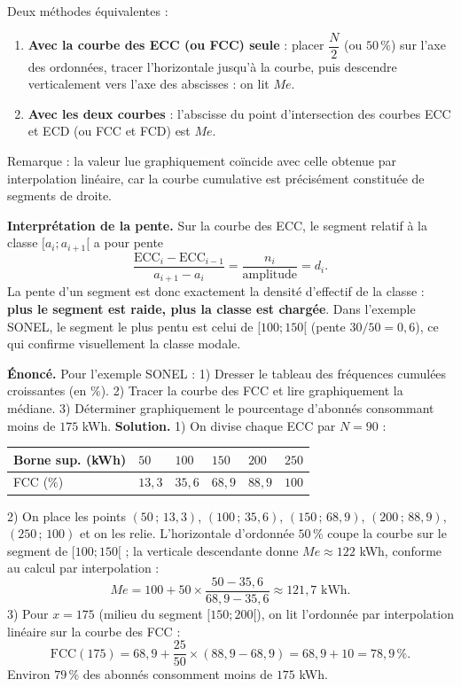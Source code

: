 \documentclass[11pt]{article}
\newcommand{\cle}[1]{{\popxbold\color{popdark}#1}}
\begin{document}
\begin{methode}
Deux méthodes équivalentes :
\begin{enumerate}
\item \textbf{Avec la courbe des ECC (ou FCC) seule} : placer $\dfrac{N}{2}$ (ou $50\,\%$) sur l'axe des ordonnées, tracer l'horizontale jusqu'à la courbe, puis descendre verticalement vers l'axe des abscisses : on lit $Me$.
\item \textbf{Avec les deux courbes} : l'abscisse du point d'intersection des courbes ECC et ECD (ou FCC et FCD) est $Me$.
\end{enumerate}
Remarque : la valeur lue graphiquement coïncide avec celle obtenue par interpolation linéaire, car la courbe cumulative est précisément constituée de segments de droite.
\end{methode}

\textbf{Interprétation de la pente.} Sur la courbe des ECC, le segment relatif à la classe $[a_i ; a_{i+1}[$ a pour pente
\[ \frac{\text{ECC}_i - \text{ECC}_{i-1}}{a_{i+1}-a_i} = \frac{n_i}{\text{amplitude}} = d_i. \]
La pente d'un segment est donc exactement la \cle{densité d'effectif} de la classe : \textbf{plus le segment est raide, plus la classe est chargée}. Dans l'exemple SONEL, le segment le plus pentu est celui de $[100;150[$ (pente $30/50 = 0{,}6$), ce qui confirme visuellement la classe modale.

\begin{exoresolu}
\textbf{Énoncé.} Pour l'exemple SONEL : 1) Dresser le tableau des fréquences cumulées croissantes (en $\%$). 2) Tracer la courbe des FCC et lire graphiquement la médiane. 3) Déterminer graphiquement le pourcentage d'abonnés consommant moins de $175$ kWh.
\tcblower
\textbf{Solution.} 1) On divise chaque ECC par $N = 90$ :
\begin{center}
\begin{tabularx}{\linewidth}{|l|X|X|X|X|X|}\hline
\rowcolor{popblueL} Borne sup. (kWh) & $50$ & $100$ & $150$ & $200$ & $250$ \\ \hline
FCC ($\%$) & $13{,}3$ & $35{,}6$ & $68{,}9$ & $88{,}9$ & $100$ \\ \hline
\end{tabularx}
\end{center}
2) On place les points $(50\,;\,13{,}3)$, $(100\,;\,35{,}6)$, $(150\,;\,68{,}9)$, $(200\,;\,88{,}9)$, $(250\,;\,100)$ et on les relie. L'horizontale d'ordonnée $50\,\%$ coupe la courbe sur le segment de $[100;150[$ ; la verticale descendante donne $Me \approx 122$ kWh, conforme au calcul par interpolation :
\[ Me = 100 + 50\times\frac{50-35{,}6}{68{,}9-35{,}6} \approx 121{,}7 \text{ kWh}. \]
3) Pour $x = 175$ (milieu du segment $[150;200[$), on lit l'ordonnée par interpolation linéaire sur la courbe des FCC :
\[ \text{FCC}(175) = 68{,}9 + \frac{25}{50}\times (88{,}9 - 68{,}9) = 68{,}9 + 10 = 78{,}9\,\%. \]
Environ $79\,\%$ des abonnés consomment moins de $175$ kWh.
\end{exoresolu}
\end{document}
